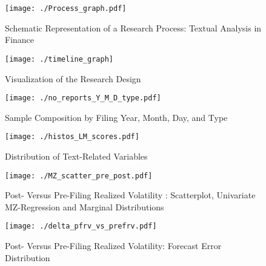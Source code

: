\begin{figure}[H]
	\centering
		\texttt{[image: ./Process\_graph.pdf]}
		\caption{Schematic Representation of a Research Process: Textual Analysis in Finance}
		\label{fig: process_schema}
\end{figure}

\clearpage

\begin{figure}[H]
	\centering
		\texttt{[image: ./timeline\_graph]}
		\caption{Visualization of the Research Design}
		\label{fig: res_design}
\end{figure}

\clearpage

\begin{figure}[H]
	\centering
		\texttt{[image: ./no\_reports\_Y\_M\_D\_type.pdf]}
		\caption{Sample Composition by Filing Year, Month, Day, and Type}
		\label{fig: no_reports_ymd_typestacked}
\end{figure}

\clearpage

\begin{figure}[H]
	\centering
		\texttt{[image: ./histos\_LM\_scores.pdf]}
		\caption{Distribution of Text-Related Variables}
		\label{fig: histos_sentiscores}
\end{figure}

\clearpage

\begin{figure}[H]
	\centering
		\texttt{[image: ./MZ\_scatter\_pre\_post.pdf]}
		\caption{Post- Versus Pre-Filing Realized Volatility : Scatterplot, Univariate MZ-Regression and Marginal Distributions}
		\label{fig: pfrv_vs_tsfc}
\end{figure}

\clearpage

\begin{figure}[H]
	\centering
		\texttt{[image: ./delta\_pfrv\_vs\_prefrv.pdf]}
		\caption{Post- Versus Pre-Filing Realized Volatility: Forecast Error Distribution}
		\label{fig: delta_histos_pfrv_vs_tsfc}
\end{figure}

\clearpage